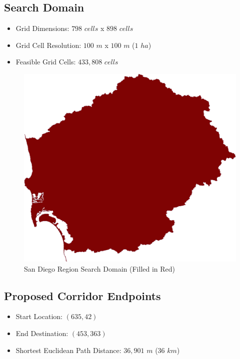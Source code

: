     \subsection{Search Domain}
    
    \begin{itemize}
      \setlength{\itemsep}{0cm}
      \setlength{\parskip}{0cm}
        \item Grid Dimensions: $798$ $cells$ x $898$ $cells$
        \item Grid Cell Resolution: $100$ $m$ x $100$ $m$ ($1$ $ha$)
        \item Feasible Grid Cells: $433,808$ $cells$
    \end{itemize}
    
        \begin{figure}[!h]
            \begin{center}
            \includegraphics[width=5.5in]{figures/SanDiego_SearchDomain.png}   
            \caption{San Diego Region Search Domain (Filled in Red)}
            \label{fig:SDdomain}
            \end{center}
        \end{figure}

    \subsection{Proposed Corridor Endpoints}
    
    \begin{itemize}
      \setlength{\itemsep}{0cm}
      \setlength{\parskip}{0cm}
        \item Start Location: $(635,42)$
        \item End Destination: $(453,363)$    
        \item Shortest Euclidean Path Distance: $36,901$ $m$ ($36$ $km$)
    \end{itemize}
    
